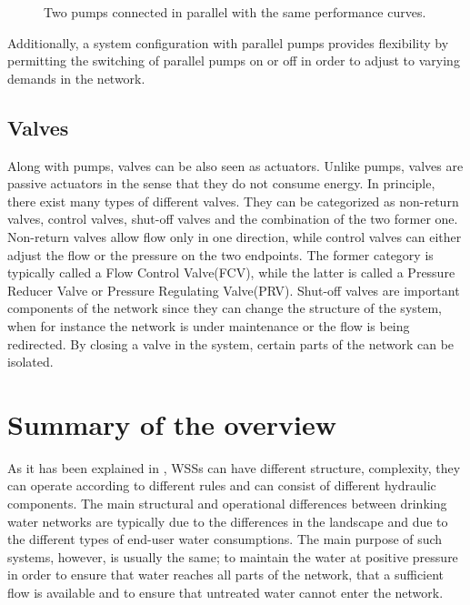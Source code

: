 \begin{figure}[H]
\centering
 
\caption{Two pumps connected in parallel with the same performance curves.}
\label{fig:parallelpumpcurve}
\end{figure}

\vspace{-3mm}

Additionally, a system configuration with parallel pumps provides flexibility by permitting the switching of parallel pumps on or off in order to adjust to varying demands in the network. 

\subsection{Valves}
\label{valves}

Along with pumps, valves can be also seen as actuators. Unlike pumps, valves are passive actuators in the sense that they do not consume energy. In principle, there exist many types of different valves. They can be categorized as non-return valves, control valves, shut-off valves and the combination of the two former one. Non-return valves allow flow only in one direction, while control valves can either adjust the flow or the pressure on the two endpoints. The former category is typically called a Flow Control Valve(FCV), while the latter is called a Pressure Reducer Valve or Pressure Regulating Valve(PRV). Shut-off valves are important components of the network since they can change the structure of the system, when for instance the network is under maintenance or the flow is being redirected. By closing a valve in the system, certain parts of the network can be isolated.

\section{Summary of the overview}
\label{distribution_system_solutions}

As it has been explained in , WSSs can have different structure, complexity, they can operate according to different rules and can consist of different hydraulic components. The main structural and operational differences between drinking water networks are typically due to the differences in the landscape and due to the different types of end-user water consumptions. The main purpose of such systems, however, is usually the same; to maintain the water at positive pressure in order to ensure that water reaches all parts of the network, that a sufficient flow is available and to ensure that untreated water cannot enter the network. 

